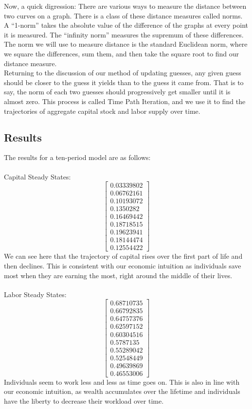 \documentclass[letterpaper,12pt]{article}
\theoremstyle{definition}
\begin{document}
\indent Now, a quick digression: There are various ways to measure the distance between two curves on a graph. There is a class of these distance measures called norms. A ``1-norm'' takes the absolute value of the difference of the graphs at every point it is measured. The ``infinity norm'' measures the supremum of these differences. The norm we will use to measure distance is the standard Euclidean norm, where we square the differences, sum them, and then take the square root to find our distance measure.\\
\indent Returning to the discussion of our method of updating guesses, any given guess should be closer to the guess it yields than to the guess it came from. That is to say, the norm of each two guesses should progressively get smaller until it is almost zero. This process is called Time Path Iteration, and we use it to find the trajectories of aggregate capital stock and labor supply over time. 

\subsection*{Results}
The results for a ten-period model are as follows:\\\\
Capital Steady States:
\[ 
\begin{bmatrix}
0.03339802\\
0.06762161\\
0.10193072\\
0.1350282\\
0.16469442\\
0.18718515\\
  0.19623941\\
  0.18144474\\
  0.12554422
\end{bmatrix}
\]
We can see here that the trajectory of capital rises over the first part of life and then declines. This is consistent with our economic intuition as individuals save most when they are earning the most, right around the middle of their lives. \\\\

Labor Steady States:
\[
\begin{bmatrix}
 0.68710735\\
 0.66792835\\
 0.64757376\\
 0.62597152\\
 0.60304516\\
 0.5787135\\
  0.55289042\\
  0.52548449\\
  0.49639869\\
  0.46553006
\end{bmatrix}
\]
Individuals seem to work less and less as time goes on. This is also in line with our economic intuition, as wealth accumulates over the lifetime and individuals have the liberty to decrease their workload over time.
\end{document}
